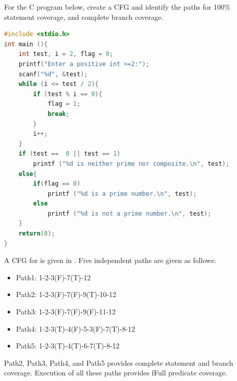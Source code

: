 \begin{example}
For the C program below, create a CFG and identify the paths for 100\% statement coverage, and complete branch coverage.

\begin{lstlisting}[language=C, caption={A C program to test if a number is prime or not.}]
#include <stdio.h>
int main (){
	int test, i = 2, flag = 0;
	printf("Enter a positive int >=2:");
	scanf("%d", &test);
	while (i <= test / 2){
		if (test % i == 0){
			flag = 1;
			break;
		}
		i++;
	}
	if (test ==  0 || test == 1)
		printf ("%d is neither prime nor composite.\n", test);
	else{
		if(flag == 0)
			printf ("%d is a prime number.\n", test);
		else
			printf ("%d is not a prime number.\n", test);
	}
	return(0);
}
\end{lstlisting}
\end{example}

A CFG for  is given in . Five independent paths are given as follows:
\begin{itemize}
        \item Path1: 1-2-3(F)-7(T)-12
        \item Path2: 1-2-3(F)-7(F)-9(T)-10-12
        \item Path3: 1-2-3(F)-7(F)-9(F)-11-12
        \item Path4: 1-2-3(T)-4(F)-5-3(F)-7(T)-8-12 
        \item Path5: 1-2-3(T)-4(T)-6-7(T)-8-12 
\end{itemize}

Path2, Path3, Path4, and Path5 provides complete statement and branch coverage. Execution of all these paths provides fFull predicate coverage. 

